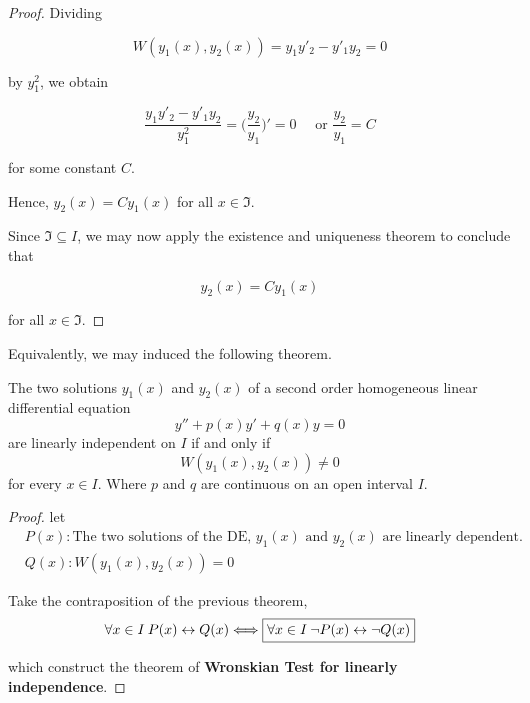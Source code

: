 \begin{proof}
     Dividing 

     \[
        W(y_1(x), y_2(x)) = y_1y'_2 - y'_1y_2 = 0
     \]

     by $y_1^2$, we obtain 

     \[
        \frac{y_1y'_2 - y'_1y_2}{y_1^2} = \biggl( \frac{y_2}{y_1} \biggr)' = 0 \quad 
        \text{ or } \frac{y_2}{y_1} = C
     \]

     for some constant $C$. 

     Hence, $y_2(x) = Cy_1(x)$ for all $x \in \mathfrak{I}$.

     Since $\mathfrak{I} \subseteq I$, we may now apply the existence and uniqueness theorem to conclude that 

     \[
        y_2(x) = Cy_1(x)
     \]

     for all $x \in \mathfrak{I}$.
\end{proof}

Equivalently, we may induced the following theorem.

\begin{theorem}
    The two solutions $y_1(x)$ and $y_2(x)$ of a second order homogeneous linear 
    differential equation
    \begin{equation}
        y'' + p(x)y' + q(x)y = 0
    \end{equation}
    are linearly independent on $I$ if and only if 
    \begin{equation}
        W(y_1(x), y_2(x)) \neq 0
    \end{equation}
    for every $x \in I$. Where $p$ and $q$ are continuous on an open interval $I$.
\end{theorem}

\begin{proof}
    let
    \begin{align*}
        &P(x): \text{The two solutions of the DE, } y_1(x) \text{ and } y_2(x) \text{ are linearly dependent.}\\
        &Q(x): W(y_1(x), y_2(x)) = 0
    \end{align*}

    Take the contraposition of the previous theorem,
    \begin{equation}
        \forall x \in I \> P(x) \leftrightarrow Q(x) \Longleftrightarrow \fbox{$\forall x \in I \> \lnot P(x) \leftrightarrow \lnot Q(x)$}
    \end{equation}

    which construct the theorem of \textbf{Wronskian Test for linearly independence}.
\end{proof}


